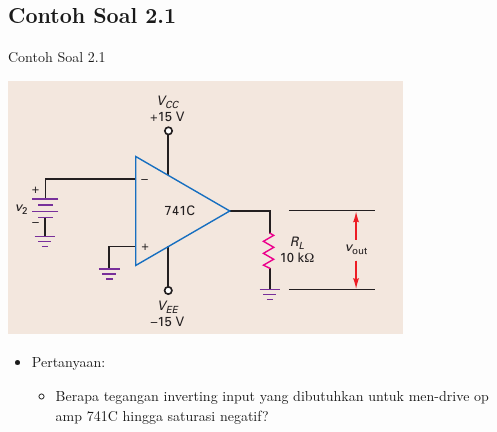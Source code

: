 \subsection{Contoh Soal 2.1}
\begin{frame}{Contoh Soal 2.1}
	\begin{multicols}{2}
		\begin{center}
			\includegraphics[width=\linewidth]{gambar/fig-16.11a}
		\end{center}
		\columnbreak
		\begin{itemize}
			\item Pertanyaan:
			\begin{itemize}
				\item Berapa tegangan inverting input yang dibutuhkan untuk men-drive op amp 741C hingga saturasi negatif?
			\end{itemize}
		\end{itemize}
	\end{multicols}
\end{frame}

